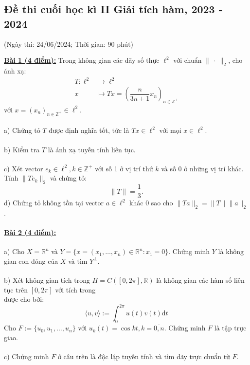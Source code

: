 \documentclass[10pt, a4paper]{article}
\begin{document}
\newpage

\subsection{Đề thi cuối học kì II Giải tích hàm, 2023 - 2024}
\begin{center}
	\color{blue}(Ngày thi: 24/06/2024; Thời gian: 90 phút)
\end{center}
\color{red}\underline{\textbf{Bài 1 (4 điểm):}} \color{black}Trong không gian các dãy số thực $\ell^2$ với chuẩn $\lVert~\cdot~\rVert_2$, cho ánh xạ: \begin{align*}
	T:\ell^2&\to\ell^2\\
	x&\mapsto Tx=\left(\dfrac{n}{3n+1}x_n\right)_{n\in\mathbb Z^+}
\end{align*}
với $x=(x_n)_{n\in\mathbb Z^+}\in\ell^2$.\\\\
\color{red}a) \color{black}Chứng tỏ $T$ được định nghĩa tốt, tức là $Tx\in\ell^2$ với mọi $x\in\ell^2$.\\\\
\color{red}b) \color{black}Kiểm tra $T$ là ánh xạ tuyến tính liên tục.\\\\
\color{red}c) \color{black}Xét vector $e_k\in\ell^2,k\in\mathbb Z^+$ với số 1 ở vị trí thứ $k$ và số 0 ở những vị trí khác. Tính $\lVert Te_k\rVert_2$ và chứng tỏ: $$\lVert T\rVert=\frac13.$$
\color{red}d) \color{black}Chứng tỏ không tồn tại vector $a\in\ell^2$ khác 0 sao cho $\lVert Ta\rVert_2=\lVert T\rVert\lVert a\rVert_2$.\\\\
\color{red}\underline{\textbf{Bài 2 (4 điểm):}}\\\\
\color{red}a) \color{black}Cho $X=\mathbb R^n$ và $Y=\{x=(x_1,\ldots,x_n)\in\mathbb R^n:x_1=0\}$. Chứng minh $Y$ là không gian con đóng của $X$ và tìm $Y^\perp$.\\\\
\color{red}b) \color{black}Xét không gian tích trong $H=C([0,2\pi],\mathbb R)$ là không gian các hàm số liên tục trên $[0,2\pi]$ với tích trong\\ được cho bởi: $$\langle u,v\rangle:=\int_0^{2\pi}u(t)v(t)\text{d}t$$
Cho $F:=\{u_0,u_1,\ldots,u_n\}$ với $u_k(t)=\cos kt,k=\overline{0,n}$. Chứng minh $F$ là tập trực giao.\\\\
\color{red}c) \color{black}Chứng minh $F$ ở câu trên là độc lập tuyến tính và tìm dãy trực chuẩn từ $F$.\\\\
\end{document}
